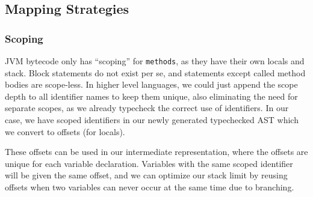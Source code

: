 \documentclass[11pt]{article}
\begin{document}
\subsection{Mapping Strategies}
\subsubsection{Scoping}
JVM bytecode only has ``scoping'' for \texttt{methods}, as they have
their own locals and stack. Block statements do not exist per se,
and statements except called method bodies are scope-less. In
higher level languages, we could just append the scope depth to
all identifier names to keep them unique, also eliminating the
need for separate scopes, as we already typecheck the correct use
of identifiers. In our case, we have scoped identifiers in our
newly generated typechecked AST which we convert to offsets (for
locals).

These offsets can be used in our intermediate representation,
where the offsets are unique for each variable
declaration. Variables with the same scoped identifier will be
given the same offset, and we can optimize our stack limit by
reusing offsets when two variables can never occur at the same
time due to branching.
\end{document}
